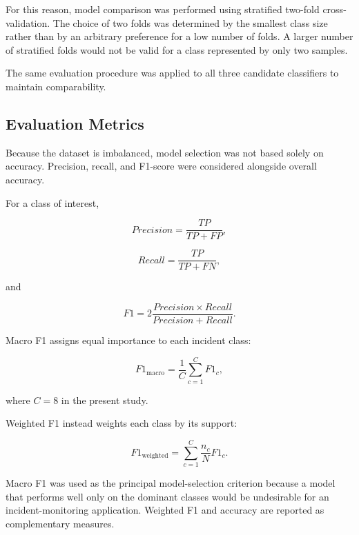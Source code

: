 \documentclass[conference]{IEEEtran}
\begin{document}
For this reason, model comparison was performed using stratified
two-fold cross-validation. The choice of two folds was determined by the
smallest class size rather than by an arbitrary preference for a low number
of folds. A larger number of stratified folds would not be valid for a class
represented by only two samples.

The same evaluation procedure was applied to all three candidate classifiers
to maintain comparability.

\subsection{Evaluation Metrics}

Because the dataset is imbalanced, model selection was not based solely on
accuracy. Precision, recall, and F1-score were considered alongside overall
accuracy.

For a class of interest,

\begin{equation}
Precision=\frac{TP}{TP+FP},
\end{equation}

\begin{equation}
Recall=\frac{TP}{TP+FN},
\end{equation}

and

\begin{equation}
F1 =
2\frac{Precision \times Recall}
{Precision+Recall}.
\end{equation}

Macro F1 assigns equal importance to each incident class:

\begin{equation}
F1_{\mathrm{macro}}
=
\frac{1}{C}
\sum_{c=1}^{C}F1_c,
\end{equation}

where $C=8$ in the present study.

Weighted F1 instead weights each class by its support:

\begin{equation}
F1_{\mathrm{weighted}}
=
\sum_{c=1}^{C}
\frac{n_c}{N}F1_c.
\end{equation}

Macro F1 was used as the principal model-selection criterion because a model
that performs well only on the dominant classes would be undesirable for an
incident-monitoring application. Weighted F1 and accuracy are reported as
complementary measures.
\end{document}
